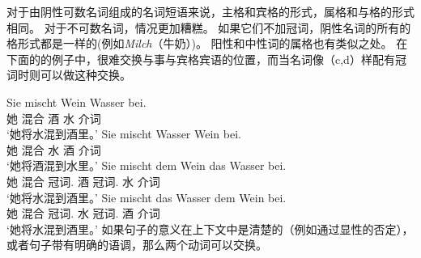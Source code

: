 对于由阴性可数名词组成的名词短语来说，主格和宾格的形式，属格和与格的形式相同。
对于不可数名词，情况更加糟糕。
如果它们不加冠词，阴性名词的所有的格形式都是一样的(例如\emph{Milch}（牛奶）)。
阳性和中性词的属格也有类似之处。
在下面的\citet[]{Wegener85b}的例子中，很难交换与事与宾格宾语的位置，而当名词像（c,d）样配有冠词时则可以做这种交换。

\eal
\ex 
\gll Sie mischt Wein Wasser bei.\\
     她 混合 酒 水 介词 \\
\glt `她将水混到酒里。'
\ex 
\gll Sie mischt Wasser Wein bei.\\
     她 混合 水 酒 介词 \\
\glt `她将酒混到水里。'
\ex 
\gll Sie mischt dem Wein das Wasser bei.\\
     她 混合 冠词.\dat{} 酒 冠词.\acc{} 水 介词 \\ 
\glt `她将水混到酒里。'
\ex 
\gll Sie mischt das Wasser dem Wein bei.\\
     她 混合 冠词.\acc{} 水 冠词.\dat{} 酒 介词 \\ 
\glt `她将水混到酒里。'
\zl
如果句子的意义在上下文中是清楚的（例如通过显性的否定），或者句子带有明确的语调，那么两个动词可以交换。

